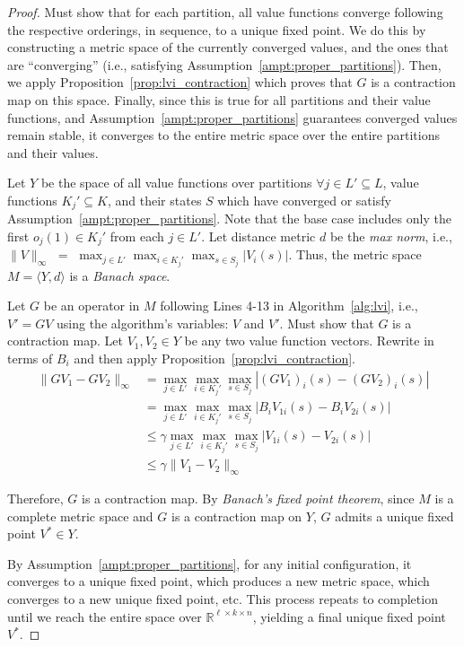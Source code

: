 \begin{proof}
Must show that for each partition, all value functions converge following the respective orderings, in sequence, to a unique fixed point. We do this by constructing a metric space of the currently converged values, and the ones that are ``converging'' (i.e., satisfying Assumption~\ref{ampt:proper_partitions}). Then, we apply Proposition~\ref{prop:lvi_contraction} which proves that $G$ is a contraction map on this space. Finally, since this is true for all partitions and their value functions, and Assumption~\ref{ampt:proper_partitions} guarantees converged values remain stable, it converges to the entire metric space over the entire partitions and their values.

Let $Y$ be the space of all value functions over partitions $\forall j \in L' \subseteq L$, value functions $K_j' \subseteq K$, and their states $S$ which have converged or satisfy Assumption~\ref{ampt:proper_partitions}. Note that the base case includes only the first $o_j(1) \in K_j'$ from each $j \in L'$. Let distance metric $d$ be the \emph{max norm}, i.e., $\|V\|_\infty$ $=$ $\max_{j \in L'} \max_{i \in K_j'} \max_{s \in S_j} | V_i(s) |$. Thus, the metric space $M = \langle Y, d \rangle$ is a \emph{Banach space}.

Let $G$ be an operator in $M$ following Lines 4-13 in Algorithm~\ref{alg:lvi}, i.e., $V' = GV$ using the algorithm's variables: $V$ and $V'$. Must show that $G$ is a contraction map. Let $V_1, V_2 \in Y$ be any two value function vectors. Rewrite in terms of $B_i$ and then apply Proposition~\ref{prop:lvi_contraction}.
\begin{align*}
    \| G V_1 - G V_2 \|_\infty &= \max_{j \in L'} \max_{i \in K_j'} \max_{s \in S_j} | (G V_1)_i (s) - (G V_2)_i (s) | \\
        &= \max_{j \in L'} \max_{i \in K_j'} \max_{s \in S_j} | B_i V_{1i} (s) - B_i V_{2i} (s) | \\
        &\leq \gamma \max_{j \in L'} \max_{i \in K_j'} \max_{s \in S_j} | V_{1i} (s) - V_{2i} (s) | \\
        &\leq \gamma \| V_1 - V_2 \|_\infty
\end{align*}

Therefore, $G$ is a contraction map. By \emph{Banach's fixed point theorem}, since $M$ is a complete metric space and $G$ is a contraction map on $Y$, $G$ admits a unique fixed point $V^* \in Y$.

By Assumption~\ref{ampt:proper_partitions}, for any initial configuration, it converges to a unique fixed point, which produces a new metric space, which converges to a new unique fixed point, etc. This process repeats to completion until we reach the entire space over $\mathbb{R}^{\ell \times k \times n}$, yielding a final unique fixed point $V^*$.
\end{proof}


